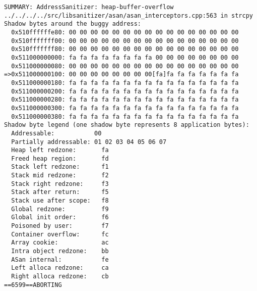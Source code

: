 \begin{lstlisting}[language={}, caption={Output di ASan sul primo caso di test}, numbers=none, inputencoding=utf8, basicstyle=\scriptsize\ttfamily]
SUMMARY: AddressSanitizer: heap-buffer-overflow ../../../../src/libsanitizer/asan/asan_interceptors.cpp:563 in strcpy
Shadow bytes around the buggy address:
  0x510ffffffe80: 00 00 00 00 00 00 00 00 00 00 00 00 00 00 00 00
  0x510fffffff00: 00 00 00 00 00 00 00 00 00 00 00 00 00 00 00 00
  0x510fffffff80: 00 00 00 00 00 00 00 00 00 00 00 00 00 00 00 00
  0x511000000000: fa fa fa fa fa fa fa fa 00 00 00 00 00 00 00 00
  0x511000000080: 00 00 00 00 00 00 00 00 00 00 00 00 00 00 00 00
=>0x511000000100: 00 00 00 00 00 00 00 00[fa]fa fa fa fa fa fa fa
  0x511000000180: fa fa fa fa fa fa fa fa fa fa fa fa fa fa fa fa
  0x511000000200: fa fa fa fa fa fa fa fa fa fa fa fa fa fa fa fa
  0x511000000280: fa fa fa fa fa fa fa fa fa fa fa fa fa fa fa fa
  0x511000000300: fa fa fa fa fa fa fa fa fa fa fa fa fa fa fa fa
  0x511000000380: fa fa fa fa fa fa fa fa fa fa fa fa fa fa fa fa
Shadow byte legend (one shadow byte represents 8 application bytes):
  Addressable:           00
  Partially addressable: 01 02 03 04 05 06 07 
  Heap left redzone:       fa
  Freed heap region:       fd
  Stack left redzone:      f1
  Stack mid redzone:       f2
  Stack right redzone:     f3
  Stack after return:      f5
  Stack use after scope:   f8
  Global redzone:          f9
  Global init order:       f6
  Poisoned by user:        f7
  Container overflow:      fc
  Array cookie:            ac
  Intra object redzone:    bb
  ASan internal:           fe
  Left alloca redzone:     ca
  Right alloca redzone:    cb
==6599==ABORTING
\end{lstlisting}